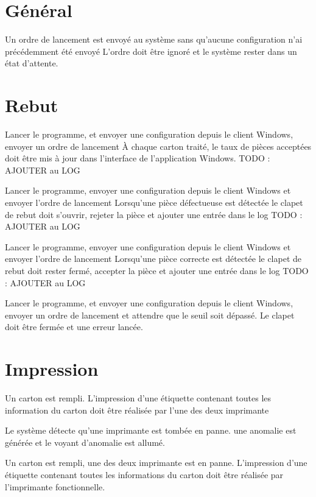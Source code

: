 \section{Général}

{Un ordre de lancement est envoyé au système sans qu'aucune configuration n'ai précédemment été envoyé}
{L'ordre doit être ignoré et le système rester dans un état d'attente.}

\section{Rebut}
{Lancer le programme, et envoyer une configuration depuis le client Windows, envoyer un ordre de lancement}
{À chaque carton traité, le taux de pièces acceptées doit être mis à jour dans l'interface de l'application Windows.}
TODO : AJOUTER au LOG

{Lancer le programme, envoyer une configuration depuis le client Windows et envoyer l'ordre de lancement}
{Lorsqu'une pièce défectueuse est détectée le clapet de rebut doit s'ouvrir, rejeter la pièce et ajouter une entrée dans le log}
TODO : AJOUTER au LOG

{Lancer le programme, envoyer une configuration depuis le client Windows et envoyer l'ordre de lancement}
{Lorsqu'une pièce correcte est détectée le clapet de rebut doit rester fermé, accepter la pièce et ajouter une entrée dans le log}
TODO : AJOUTER au LOG

{Lancer le programme, et envoyer une configuration depuis le client Windows, envoyer un ordre de lancement
et attendre que le seuil soit dépassé.}
{Le clapet doit être fermée et une erreur lancée.}

\section{Impression}
{Un carton est rempli.}
{L'impression d'une étiquette contenant toutes les information du carton doit être réalisée par l'une des deux imprimante}

{Le système détecte qu'une imprimante est tombée en panne.}
{une anomalie est générée et le voyant d'anomalie est allumé.}

{Un carton est rempli, une des deux imprimante est en panne.}
{L'impression d'une étiquette contenant toutes les informations du carton doit être réalisée par l'imprimante fonctionnelle. }

